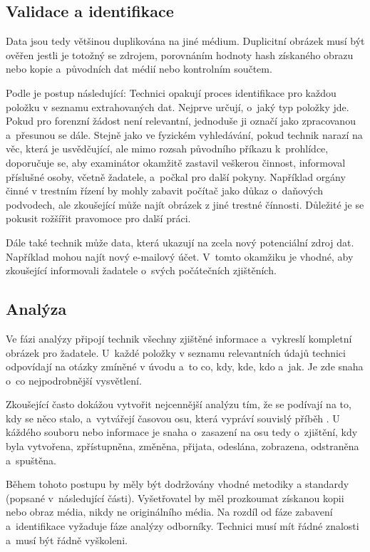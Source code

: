 \documentclass[thesis=B,czech]{FITthesis}[2012/06/26]
\begin{document}
\subsection{Validace a identifikace}

Data jsou tedy většinou duplikována na jiné médium. Duplicitní obrázek musí být ověřen jestli je totožný se zdrojem, porovnáním hodnoty hash získaného obrazu nebo kopie a~původních dat médií nebo kontrolním součtem.


Podle \cite{carroll2008computer} je postup následující: Technici opakují proces identifikace pro každou položku v seznamu extrahovaných dat. Nejprve určují, o~jaký typ položky jde. Pokud pro forenzní žádost není relevantní, jednoduše ji označí jako zpracovanou a~přesunou se dále. Stejně jako ve fyzickém vyhledávání, pokud technik narazí na věc, která je usvědčující, ale mimo rozsah původního příkazu k~prohlídce, doporučuje se, aby examinátor okamžitě zastavil veškerou činnost, informoval příslušné osoby, včetně žadatele, a~počkal pro další pokyny. Například orgány činné v trestním řízení by mohly zabavit počítač jako důkaz o~daňových podvodech, ale zkoušející může najít obrázek z jiné trestné čínnosti. Důležité je se pokusit rožšířit pravomoce pro další práci.

Dále také technik může data, která ukazují na zcela nový potenciální zdroj dat. Například mohou najít nový e-mailový účet. V~tomto okamžiku je vhodné, aby zkoušející informovali žadatele o~svých počátečních zjištěních.

\subsection{Analýza}
Ve fázi analýzy připojí technik všechny zjištěné informace a~vykreslí kompletní obrázek pro žadatele\cite{carroll2008computer}. U~každé položky v seznamu relevantních údajů technici odpovídají na otázky zmíněné v úvodu a~to co, kdy, kde, kdo a~jak. Je zde snaha o~co nejpodrobnější vysvětlení.

Zkoušející často dokážou vytvořit nejcennější analýzu tím, že se podívají na to, kdy se něco stalo, a~vytvářejí časovou osu, která vypráví souvislý příběh \cite{carroll2008computer}. U káždého souboru nebo informace je snaha o~zasazení na osu tedy o~zjištění, kdy byla vytvořena, zpřístupněna, změněna, přijata, odeslána, zobrazena, odstraněna a~spuštěna. 

Během tohoto postupu by měly být dodržovány vhodné metodiky a standardy (popsané v~následující části)\cite{for_sez}. Vyšetřovatel by měl prozkoumat získanou kopii nebo obraz média, nikdy ne originálního média. Na rozdíl od fáze zabavení a~identifikace vyžaduje fáze analýzy odborníky. Technici musí mít řádné znalosti a~musí být řádně vyškoleni. 
\end{document}
